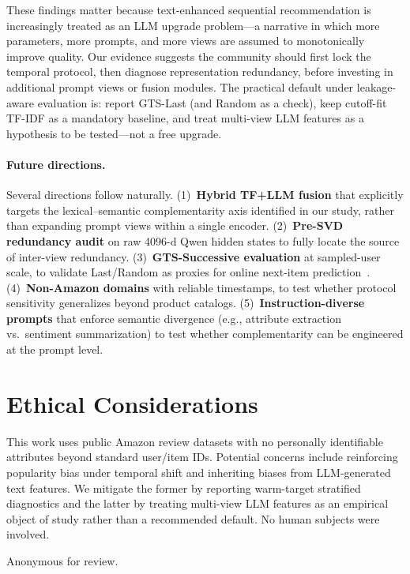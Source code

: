 \documentclass[sigconf,natbib=true,anonymous]{acmart}
\newcommand{\tfidf}{\textsc{TF-IDF}\xspace}
\begin{document}
These findings matter because text-enhanced sequential recommendation is increasingly treated as an LLM upgrade problem---a narrative in which more parameters, more prompts, and more views are assumed to monotonically improve quality.
Our evidence suggests the community should first lock the temporal protocol, then diagnose representation redundancy, before investing in additional prompt views or fusion modules.
The practical default under leakage-aware evaluation is: report GTS-Last (and Random as a check), keep cutoff-fit \tfidf as a mandatory baseline, and treat multi-view LLM features as a hypothesis to be tested---not a free upgrade.

\paragraph{Future directions.}
Several directions follow naturally.
(1)~\textbf{Hybrid TF+LLM fusion} that explicitly targets the lexical--semantic complementarity axis identified in our study, rather than expanding prompt views within a single encoder.
(2)~\textbf{Pre-SVD redundancy audit} on raw 4096-d Qwen hidden states to fully locate the source of inter-view redundancy.
(3)~\textbf{GTS-Successive evaluation} at sampled-user scale, to validate Last/Random as proxies for online next-item prediction~\cite{liang2024timetosplit}.
(4)~\textbf{Non-Amazon domains} with reliable timestamps, to test whether protocol sensitivity generalizes beyond product catalogs.
(5)~\textbf{Instruction-diverse prompts} that enforce semantic divergence (e.g., attribute extraction vs.\ sentiment summarization) to test whether complementarity can be engineered at the prompt level.

\section*{Ethical Considerations}
This work uses public Amazon review datasets with no personally identifiable attributes beyond standard user/item IDs.
Potential concerns include reinforcing popularity bias under temporal shift and inheriting biases from LLM-generated text features.
We mitigate the former by reporting warm-target stratified diagnostics and the latter by treating multi-view LLM features as an empirical object of study rather than a recommended default.
No human subjects were involved.

\begin{acks}
Anonymous for review.
\end{acks}
\end{document}
